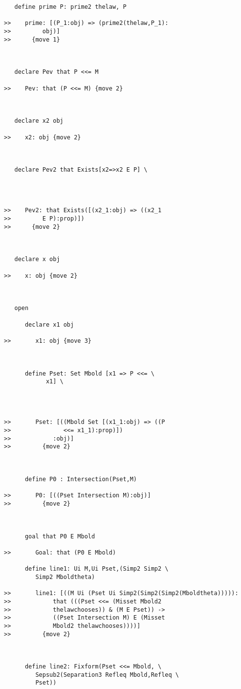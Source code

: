 \documentclass[12pt]{article}
\begin{document}
\begin{verbatim}
   define prime P: prime2 thelaw, P

>>    prime: [(P_1:obj) => (prime2(thelaw,P_1):
>>         obj)]
>>      {move 1}



   declare Pev that P <<= M

>>    Pev: that (P <<= M) {move 2}



   declare x2 obj

>>    x2: obj {move 2}



   declare Pev2 that Exists[x2=>x2 E P] \
      



>>    Pev2: that Exists([(x2_1:obj) => ((x2_1
>>         E P):prop)])
>>      {move 2}



   declare x obj

>>    x: obj {move 2}



   open

      declare x1 obj

>>       x1: obj {move 3}



      define Pset: Set Mbold [x1 => P <<= \
            x1] \
         



>>       Pset: [((Mbold Set [(x1_1:obj) => ((P
>>               <<= x1_1):prop)])
>>            :obj)]
>>         {move 2}



      define P0 : Intersection(Pset,M)

>>       P0: [((Pset Intersection M):obj)]
>>         {move 2}



      goal that P0 E Mbold

>>       Goal: that (P0 E Mbold)

      define line1: Ui M,Ui Pset,(Simp2 Simp2 \
         Simp2 Mboldtheta)

>>       line1: [((M Ui (Pset Ui Simp2(Simp2(Simp2(Mboldtheta))))):
>>            that (((Pset <<= (Misset Mbold2
>>            thelawchooses)) & (M E Pset)) ->
>>            ((Pset Intersection M) E (Misset
>>            Mbold2 thelawchooses))))]
>>         {move 2}



      define line2: Fixform(Pset <<= Mbold, \
         Sepsub2(Separation3 Refleq Mbold,Refleq \
         Pset))


\end{verbatim}
\end{document}

